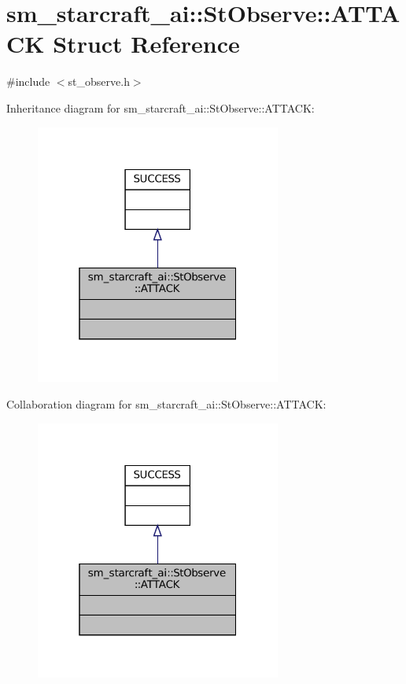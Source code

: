 \hypertarget{structsm__starcraft__ai_1_1StObserve_1_1ATTACK}{}\section{sm\+\_\+starcraft\+\_\+ai\+:\+:St\+Observe\+:\+:A\+T\+T\+A\+CK Struct Reference}
\label{structsm__starcraft__ai_1_1StObserve_1_1ATTACK}


{\ttfamily \#include $<$st\+\_\+observe.\+h$>$}



Inheritance diagram for sm\+\_\+starcraft\+\_\+ai\+:\+:St\+Observe\+:\+:A\+T\+T\+A\+CK\+:
\nopagebreak
\begin{figure}[H]
\begin{center}
\leavevmode
\includegraphics[width=229pt]{structsm__starcraft__ai_1_1StObserve_1_1ATTACK__inherit__graph}
\end{center}
\end{figure}


Collaboration diagram for sm\+\_\+starcraft\+\_\+ai\+:\+:St\+Observe\+:\+:A\+T\+T\+A\+CK\+:
\nopagebreak
\begin{figure}[H]
\begin{center}
\leavevmode
\includegraphics[width=229pt]{structsm__starcraft__ai_1_1StObserve_1_1ATTACK__coll__graph}
\end{center}
\end{figure}


